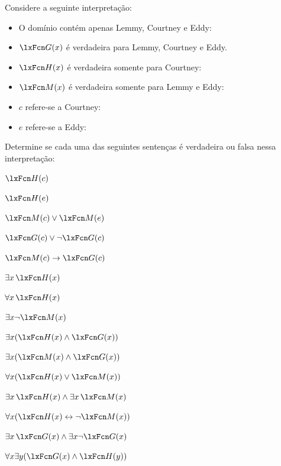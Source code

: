 \problempart
\label{pr.TorF2}
Considere a seguinte interpretação:
	\begin{itemize}
		\item O domínio contém apenas Lemmy, Courtney e Eddy:
		\item $\atom{G}{x}$ é verdadeira para Lemmy, Courtney e Eddy.
		\item $\atom{H}{x}$ é verdadeira somente para Courtney:
		\item $\atom{M}{x}$ é verdadeira somente para Lemmy e Eddy:
		\item $c$ refere-se a Courtney:
		\item $e$ refere-se a Eddy:
	\end{itemize}
Determine se cada uma das seguintes sentenças é verdadeira ou falsa nessa interpretação:
\begin{compactlist}
\item $\atom{H}{c}$ \hfill {}
\item $\atom{H}{e}$\hfill {}
\item $\atom{M}{c} \eor \atom{M}{e}$ \hfill {}
\item $\atom{G}{c} \eor \enot \atom{G}{c}$ \hfill {}
\item $\atom{M}{c} \eif \atom{G}{c}$ \hfill {}
\item $\exists x\,\atom{H}{x}$ \hfill {}
\item $\forall x\,\atom{H}{x}$ \hfill {}
\item $\exists x \enot \atom{M}{x}$ \hfill {}
\item $\exists x(\atom{H}{x} \eand \atom{G}{x})$ \hfill {}
\item $\exists x(\atom{M}{x} \eand \atom{G}{x})$ \hfill {}
\item $\forall x(\atom{H}{x} \eor \atom{M}{x})$ \hfill {}
\item $\exists x\,\atom{H}{x} \eand \exists x\,\atom{M}{x}$ \hfill {}
\item $\forall x(\atom{H}{x} \eiff \enot \atom{M}{x})$ \hfill {}
\item $\exists x\,\atom{G}{x} \eand \exists x \enot \atom{G}{x}$ \hfill {}
\item $\forall x\exists y(\atom{G}{x} \eand \atom{H}{y})$ \hfill {}
\end{compactlist}

